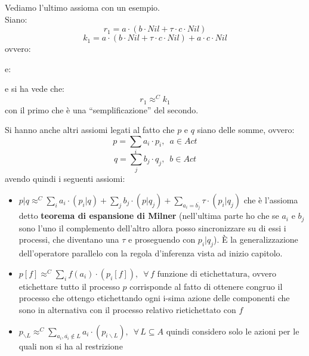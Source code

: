 \documentclass[a4paper,12pt, oneside]{book}
\begin{document}
\begin{esempio}
  Vediamo l'ultimo assioma con un esempio.\\
  Siano:
  \[r_1=a\cdot(b\cdot Nil+\tau\cdot c\cdot Nil)\]
  \[k_1=a\cdot(b\cdot Nil+\tau\cdot c\cdot Nil)+a\cdot c\cdot Nil\]
  ovvero:
  \begin{center}
  \end{center}
  \newpage
  e:
  \begin{center}
  \end{center}
  e si ha vede che:
  \[r_1\approx^C k_1\]
  con il primo che è una ``semplificazione'' del secondo.
\end{esempio}
Si hanno anche altri assiomi legati al fatto che $p$ e $q$ siano delle somme,
ovvero:
\[p=\sum_i a_i\cdot p_i,\,\,\,a\in Act\]
\[q=\sum_j b_j\cdot q_j,\,\,\,b\in Act\]
avendo quindi i seguenti assiomi:
\begin{itemize}
  \item $p|q\approx^C\sum_i a_i\cdot (p_i|q)+\sum_j b_j\cdot
  (p|q_j)+\sum_{a_i=\overline{b_j}}\tau\cdot(p_i|q_j)$ che è l'assioma detto
  \textbf{teorema di espansione di Milner} (nell'ultima parte ho che se $a_i$ e
  $b_j$ sono l'uno il complemento dell'altro allora posso sincronizzare su di
  essi i processi, che diventano una $\tau$ e proseguendo con $p_i|q_j$). È la
  generalizzazione dell'operatore parallelo con la regola d'inferenza vista ad
  inizio capitolo.
  \item $p[f]\approx^C \sum_if(a_i)\cdot(p_i[f]),\,\,\,\forall\,f\mbox{ funzione
    di etichettatura}$, ovvero etichettare tutto il processo $p$ corrisponde al
  fatto di ottenere congruo il processo che ottengo etichettando ogni i-sima
  azione delle componenti che sono in alternativa con il processo relativo
  rietichettato con $f$
  \item $p_{\backslash L}\approx^C \sum_{a_i,\overline{a_i}\not\in
    L}a_i\cdot(p_{i\backslash L}),\,\,\,\forall\,L\subseteq A$ quindi considero
  solo le azioni per le quali non si ha al restrizione
\end{itemize}
\end{document}
